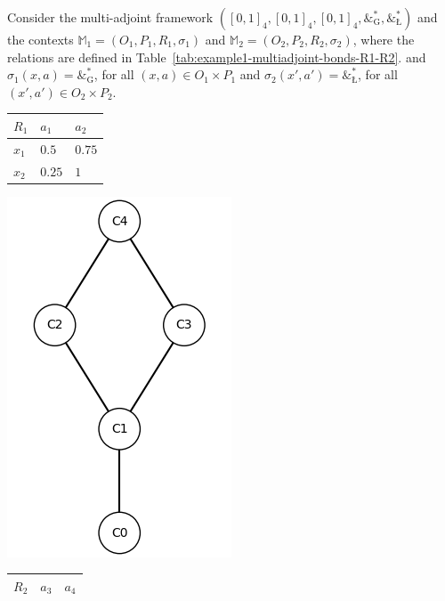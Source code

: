\documentclass[runningheads,a4paper]{llncs}
\newcommand{\M}{\mathbb{M}}
\newcommand{\adjoint}{\mathop{\&}\nolimits}
\newcommand{\G}{\text{G}}
\let\oldLcommand\L
\let\L\relax
\def\L{\text{\oldLcommand}}
\begin{document}
\begin{example}\label{ex:multiadjoint-bonds}

Consider the multi-adjoint framework $([0, 1]_4, [0, 1]_4, [0, 1]_4, \adjoint^*_\G, \adjoint^*_\L)$ and the contexts $\M_1 = (O_1, P_1, R_1, \sigma_1)$ and $\M_2 = (O_2, P_2, R_2, \sigma_2)$, where the relations are defined in Table~\ref{tab:example1-multiadjoint-bonds-R1-R2}. and $\sigma_1(x, a) = \adjoint^*_\G$, for all $(x, a) \in O_1 \times P_1$ and $\sigma_2(x', a') = \adjoint^*_\L$, for all $(x', a') \in O_2 \times P_2$.
\begin{table}[h]
	\centering
	\vspace{-0.5cm}
	\begin{minipage}{0.25\textwidth}
	\begin{tabular}{w{c}{20pt} || w{c}{20pt} | w{c}{20pt}}
		$R_1$ & $a_1$ & $a_2$ \\\hline\hline
		$x_1$ & $0.5$ & $0.75$ \\\hline
		$x_2$ & $0.25$ & $1$
	\end{tabular}
	\end{minipage}
	\begin{minipage}{0.2\textwidth}
		\includegraphics[scale = 0.3]{im/ex-ma2-R1.png}
	\end{minipage}
	\begin{minipage}{0.25\textwidth}
	\begin{tabular}{w{c}{20pt} || w{c}{20pt} | w{c}{20pt}}
		$R_2$ & $a_3$ & $a_4$ \\\hline\hline

\end{tabular}
\end{minipage}
\end{table}
\end{example}
\end{document}
